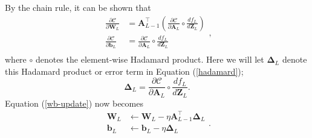 \documentclass[]{article}
\begin{document}
By the chain rule, it can be shown that
\begin{equation} \label{hadamard}
\begin{aligned}
	\frac{\partial \mathcal{C}}{\partial \mathbf{W}_L} &= 
	\mathbf{A}_{L-1}^\intercal \left(\frac{\partial \mathcal{C}}{\partial \mathbf{A}_L} \circ \frac{df_L}{d\mathbf{Z}_L} \right) \\
	\frac{\partial \mathcal{C}}{\partial \mathbf{b}_L} &= 
	\frac{\partial \mathcal{C}}{\partial \mathbf{A}_L} \circ \frac{df_L}{d\mathbf{Z}_L} \\
\end{aligned},
\end{equation}
where $\circ$ denotes the element-wise Hadamard product. Here we will let $\mathbf{\Delta}_L$ denote this Hadamard product or error term in Equation (\ref{hadamard});
\begin{equation} \label{delta-L}
	\mathbf{\Delta}_L = \frac{\partial \mathcal{C}}{\partial \mathbf{A}_L} \circ \frac{df_L}{d\mathbf{Z}_L}.
\end{equation}
Equation (\ref{wb-update}) now becomes
\begin{equation}
\begin{aligned}
	\mathbf{W}_L &\leftarrow \mathbf{W}_L - \eta \mathbf{A}_{L-1}^\intercal \mathbf{\Delta}_L \\
	\mathbf{b}_L &\leftarrow \mathbf{b}_L - \eta \mathbf{\Delta}_L \\
\end{aligned}.
\end{equation}
\end{document}
